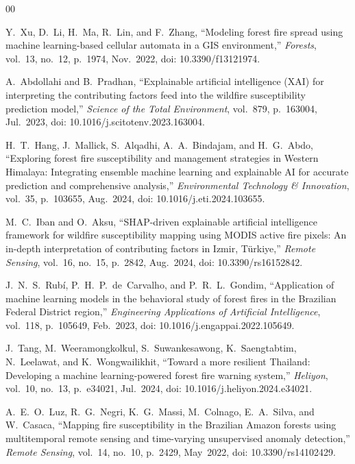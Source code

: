\documentclass{ieeeaccess}
\begin{document}
\begin{thebibliography}{00}

Y.~Xu, D.~Li, H.~Ma, R.~Lin, and F.~Zhang,
``Modeling forest fire spread using machine learning-based cellular automata in a GIS environment,''
\textit{Forests}, vol.~13, no.~12, p.~1974, Nov.~2022,
doi: 10.3390/f13121974.

A.~Abdollahi and B.~Pradhan,
``Explainable artificial intelligence (XAI) for interpreting the contributing factors feed into the wildfire susceptibility prediction model,''
\textit{Science of the Total Environment}, vol.~879, p.~163004, Jul.~2023,
doi: 10.1016/j.scitotenv.2023.163004.

H.~T.~Hang, J.~Mallick, S.~Alqadhi, A.~A.~Bindajam, and H.~G.~Abdo,
``Exploring forest fire susceptibility and management strategies in Western Himalaya: Integrating ensemble machine learning and explainable AI for accurate prediction and comprehensive analysis,''
\textit{Environmental Technology \& Innovation}, vol.~35, p.~103655, Aug.~2024,
doi: 10.1016/j.eti.2024.103655.

M.~C.~Iban and O.~Aksu,
``SHAP-driven explainable artificial intelligence framework for wildfire susceptibility mapping using MODIS active fire pixels: An in-depth interpretation of contributing factors in Izmir, T\"{u}rkiye,''
\textit{Remote Sensing}, vol.~16, no.~15, p.~2842, Aug.~2024,
doi: 10.3390/rs16152842.

J.~N.~S.~Rub\'{i}, P.~H.~P.~de~Carvalho, and P.~R.~L.~Gondim,
``Application of machine learning models in the behavioral study of forest fires in the Brazilian Federal District region,''
\textit{Engineering Applications of Artificial Intelligence}, vol.~118, p.~105649, Feb.~2023,
doi: 10.1016/j.engappai.2022.105649.

J.~Tang, M.~Weeramongkolkul, S.~Suwankesawong, K.~Saengtabtim, N.~Leelawat, and K.~Wongwailikhit,
``Toward a more resilient Thailand: Developing a machine learning-powered forest fire warning system,''
\textit{Heliyon}, vol.~10, no.~13, p.~e34021, Jul.~2024,
doi: 10.1016/j.heliyon.2024.e34021.

A.~E.~O.~Luz, R.~G.~Negri, K.~G.~Massi, M.~Colnago, E.~A.~Silva, and W.~Casaca,
``Mapping fire susceptibility in the Brazilian Amazon forests using multitemporal remote sensing and time-varying unsupervised anomaly detection,''
\textit{Remote Sensing}, vol.~14, no.~10, p.~2429, May~2022,
doi: 10.3390/rs14102429.


\end{thebibliography}
\end{document}
